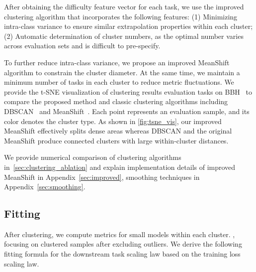 After obtaining the difficulty feature vector for each task, we use the improved clustering algorithm that incorporates the following features:
(1) Minimizing intra-class variance to ensure similar extrapolation properties within each cluster;
(2) Automatic determination of cluster numbers, as the optimal number varies across evaluation sets and is difficult to pre-specify. 


To further reduce intra-class variance, we propose an improved MeanShift algorithm to constrain the cluster diameter. At the same time, we maintain a minimum number of tasks in each cluster to reduce metric fluctuations.
We provide the t-SNE visualization of clustering results evaluation tasks on BBH~\citep{suzgun2023challenging} to compare the proposed method and classic clustering algorithms including DBSCAN~\citep{ester1996density} and MeanShift~\citep{fukunaga1975estimation}. Each point represents an evaluation sample, and its color denotes the cluster type. As shown in \cref{fig:tsne_vis}, our improved MeanShift effectively splits dense areas whereas DBSCAN and the original MeanShift produce connected clusters with large within-cluster distances.

We provide numerical comparison of clustering algorithms in~\cref{sec:clustering_ablation} and explain implementation details of improved MeanShift in Appendix~\ref{sec:improved},  smoothing techniques in Appendix~\ref{sec:smoothing}. 



\subsection{Fitting}
\label{sec:fitting}

After clustering, we compute metrics for small models within each cluster.
, focusing on clustered samples after excluding outliers. We derive the following fitting formula for the downstream task scaling law based on the training loss scaling law.


